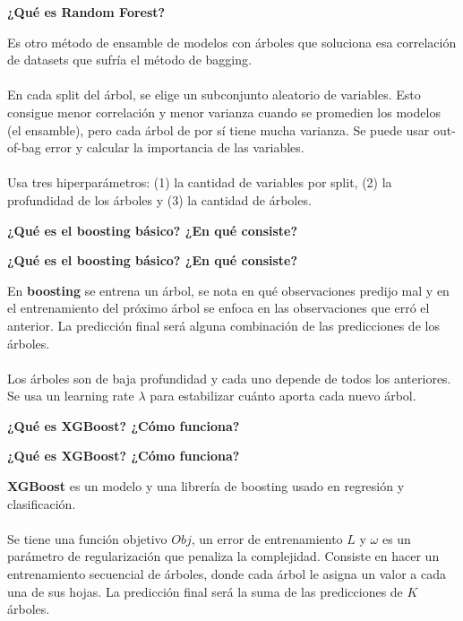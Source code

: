 \documentclass[10pt]{memoir}
\begin{document}
\clearpage
\begin{center}
	\textbf{\Large ¿Qué es Random Forest?} \\
\end{center}
\noindent Es otro método de ensamble de modelos con árboles que soluciona esa correlación de datasets que sufría el método de bagging. \\
\\
En cada split del árbol, se elige un subconjunto aleatorio de variables. Esto consigue menor correlación y menor varianza cuando se promedien los modelos (el ensamble), pero cada árbol de por sí tiene mucha varianza. Se puede usar out-of-bag error y calcular la importancia de las variables. \\
\\
Usa tres hiperparámetros: (1) la cantidad de variables por split, (2) la profundidad de los árboles y (3) la cantidad de árboles.


\clearpage
\begin{center}
	\textbf{\Large ¿Qué es el boosting básico? ¿En qué consiste?} \\
\end{center}

\clearpage
\begin{center}
	\textbf{\Large ¿Qué es el boosting básico? ¿En qué consiste?} \\
\end{center}
\noindent En \textbf{boosting} se entrena un árbol, se nota en qué observaciones predijo mal y en el entrenamiento del próximo árbol se enfoca en las observaciones que erró el anterior. La predicción final será alguna combinación de las predicciones de los árboles. \\
\\
\noindent Los árboles son de baja profundidad y cada uno depende de todos los anteriores. Se usa un learning rate $\lambda$ para estabilizar cuánto aporta cada nuevo árbol.

\clearpage
\begin{center}
	\textbf{\Large ¿Qué es XGBoost? ¿Cómo funciona?} \\
\end{center}

\clearpage
\begin{center}
	\textbf{\Large ¿Qué es XGBoost? ¿Cómo funciona?} \\
\end{center}
\noindent \textbf{XGBoost} es un modelo y una librería de boosting usado en regresión y clasificación. \\
\\
\noindent Se tiene una función objetivo $Obj$, un error de entrenamiento $L$ y $\omega$ es un parámetro de regularización que penaliza la complejidad. Consiste en hacer un entrenamiento secuencial de árboles, donde cada árbol le asigna un valor a cada una de sus hojas. La predicción final será la suma de las predicciones de $K$ árboles.
\end{document}
